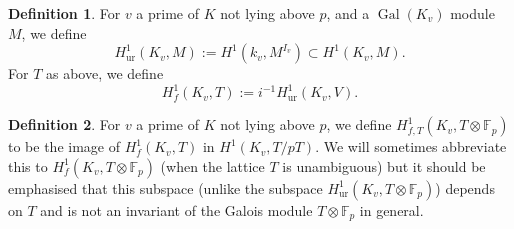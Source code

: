 \documentclass[11pt]{amsart}
\def\Q{\mathbb Q}
\def\F{\mathbb F}
\theoremstyle{plain}
\newtheorem{lemma}{Lemma}
\theoremstyle{definition}
\newtheorem{definition}{Definition}
\DeclareMathOperator{\Gal}{Gal}
\newcommand{\tors}{\mathrm{tors}}
\newcommand{\ur}{\mathrm{ur}}
\newcommand{\gr}{\mathrm{gr}}
\begin{document}
\begin{definition}
For $v$ a prime of $K$ not lying above $p$, and a $\Gal (K_v )$ module $M$, we define
\[
H^1 _{\ur}(K_v ,M):=H^1  (k_v ,M^{I_v })\subset H^1 (K_v ,M).
\]
For $T$ as above, we define
\[
H^1 _f (K_v ,T ):=i^{-1}H^1 _{\ur } (K_v ,V).
\]
\end{definition}
%
%
\begin{definition}
For $v$ a prime of $K$ not lying above $p$, we define $H^1 _{f,T} (K_v ,T\otimes \F _p )$ to be the image of $H^1 _f (K_v ,T)$ in $H^1 (K_v ,T/pT)$. We will sometimes abbreviate this to $H^1 _f (K_v ,T\otimes \F _p )$ (when the lattice $T$ is unambiguous) but it should be emphasised that this subspace (unlike the subspace $H^1 _{\ur}(K_v ,T\otimes \F_p )$) depends on $T$ and is not an invariant of the Galois module $T\otimes \F_p $ in general.
\end{definition}
\end{document}
